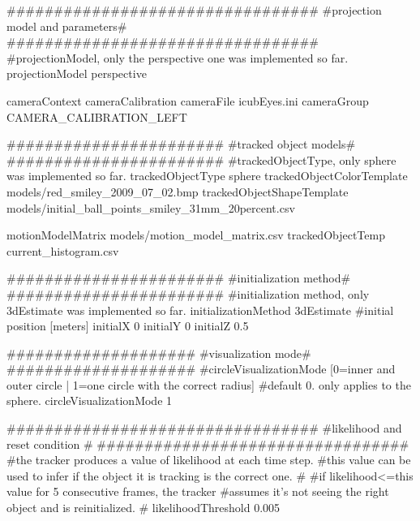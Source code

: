 \begin{DoxyCode}
\textcolor{preprocessor}{#################################}
\textcolor{preprocessor}{#projection model and parameters#}
\textcolor{preprocessor}{#################################}
\textcolor{preprocessor}{#projectionModel, only the perspective one was implemented so far.}
projectionModel             perspective

cameraContext  cameraCalibration
cameraFile     icubEyes.ini
cameraGroup    CAMERA\_CALIBRATION\_LEFT

\textcolor{preprocessor}{#######################}
\textcolor{preprocessor}{#tracked object models#}
\textcolor{preprocessor}{#######################}
\textcolor{preprocessor}{#trackedObjectType, only sphere was implemented so far.}
trackedObjectType           sphere
trackedObjectColorTemplate  models/red\_smiley\_2009\_07\_02.bmp
trackedObjectShapeTemplate  models/initial\_ball\_points\_smiley\_31mm\_20percent.csv

motionModelMatrix           models/motion\_model\_matrix.csv
trackedObjectTemp           current\_histogram.csv


\textcolor{preprocessor}{#######################}
\textcolor{preprocessor}{#initialization method#}
\textcolor{preprocessor}{#######################}
\textcolor{preprocessor}{#initialization method, only 3dEstimate was implemented so far.}
initializationMethod        3dEstimate
\textcolor{preprocessor}{#initial position [meters]}
initialX                       0
initialY                       0
initialZ                       0.5  


\textcolor{preprocessor}{####################}
\textcolor{preprocessor}{#visualization mode#}
\textcolor{preprocessor}{####################}
\textcolor{preprocessor}{#circleVisualizationMode [0=inner and outer circle | 1=one circle with the correct radius]}
\textcolor{preprocessor}{#default 0. only applies to the sphere.}
circleVisualizationMode 1


\textcolor{preprocessor}{#################################}
\textcolor{preprocessor}{#likelihood and reset condition #}
\textcolor{preprocessor}{#################################}
\textcolor{preprocessor}{#the tracker produces a value of likelihood at each time step.}
\textcolor{preprocessor}{#this value can be used to infer if the object it is tracking is the correct one.}
\textcolor{preprocessor}{#}
\textcolor{preprocessor}{#if likelihood<=this value for 5 consecutive frames, the tracker}
\textcolor{preprocessor}{#assumes it's not seeing the right object and is reinitialized.}
\textcolor{preprocessor}{#}
\textcolor{preprocessor}{likelihoodThreshold         0.005}
\end{DoxyCode}
